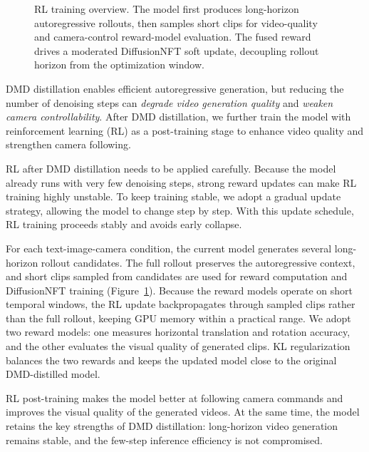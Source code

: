 \begin{figure}[!htbp]
{%
}
\caption{RL training overview. The model first produces long-horizon autoregressive rollouts, then samples short clips for video-quality and camera-control reward-model evaluation. The fused reward drives a moderated DiffusionNFT soft update, decoupling rollout horizon from the optimization window.}
\label{fig:rl-alignment}
\end{figure}



DMD distillation enables efficient autoregressive generation,
but reducing the number of denoising steps can \emph{degrade video generation quality}
and \emph{weaken camera controllability}.
After DMD distillation,
we further train the model with reinforcement learning (RL) \citep{schulman2017proximal,chu2026gpg}
as a post-training stage to enhance video quality and strengthen camera following.

RL after DMD distillation needs to be applied carefully.
Because the model already runs with very few denoising steps,
strong reward updates can make RL training highly unstable.
To keep training stable, we adopt a gradual update strategy,
allowing the model to change step by step.
With this update schedule, RL training proceeds stably
and avoids early collapse.

For each text-image-camera condition,
the current model generates several long-horizon rollout candidates.
The full rollout preserves the autoregressive context,
and short clips sampled from candidates are used for reward computation and DiffusionNFT training \citep{zheng2025diffusionnft,zhang2026astrolabe}
(Figure~\ref{fig:rl-alignment}).
Because the reward models operate on short temporal windows,
the RL update backpropagates through sampled clips rather than the full rollout,
keeping GPU memory within a practical range.
We adopt two reward models:
one measures horizontal translation and rotation accuracy,
and the other evaluates the visual quality of generated clips.
KL regularization balances the two rewards
and keeps the updated model close to the original DMD-distilled model.

\FloatBarrier

RL post-training makes the model better at following camera commands
and improves the visual quality of the generated videos.
At the same time,
the model retains the key strengths of DMD distillation:
long-horizon video generation remains stable,
and the few-step inference efficiency is not compromised.